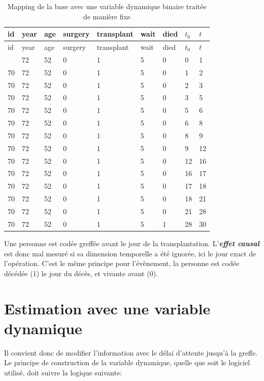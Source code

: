 \documentclass[
  12pt,
  letterpaper,
  DIV=11,
  numbers=noendperiod,
  onepage,
  openany]{scrreprt}
\begin{document}
\begin{longtable}[]{@{}lllllllll@{}}
\caption{Mapping de la base avec une variable dynamique binaire traitée
de manière fixe}\tabularnewline
\toprule\noalign{}
id & year & age & surgery & transplant & wait & died & \(t_0\) &
\(t\) \\
\midrule\noalign{}
\endfirsthead
\toprule\noalign{}
id & year & age & surgery & transplant & wait & died & \(t_0\) &
\(t\) \\
\midrule\noalign{}
\endhead
\bottomrule\noalign{}
\endlastfoot
70 & 72 & 52 & 0 & 1 & 5 & 0 & 0 & 1 \\
70 & 72 & 52 & 0 & 1 & 5 & 0 & 1 & 2 \\
70 & 72 & 52 & 0 & 1 & 5 & 0 & 2 & 3 \\
70 & 72 & 52 & 0 & 1 & 5 & 0 & 3 & 5 \\
70 & 72 & 52 & 0 & 1 & 5 & 0 & 5 & 6 \\
70 & 72 & 52 & 0 & 1 & 5 & 0 & 6 & 8 \\
70 & 72 & 52 & 0 & 1 & 5 & 0 & 8 & 9 \\
70 & 72 & 52 & 0 & 1 & 5 & 0 & 9 & 12 \\
70 & 72 & 52 & 0 & 1 & 5 & 0 & 12 & 16 \\
70 & 72 & 52 & 0 & 1 & 5 & 0 & 16 & 17 \\
70 & 72 & 52 & 0 & 1 & 5 & 0 & 17 & 18 \\
70 & 72 & 52 & 0 & 1 & 5 & 0 & 18 & 21 \\
70 & 72 & 52 & 0 & 1 & 5 & 0 & 21 & 28 \\
70 & 72 & 52 & 0 & 1 & 5 & 1 & 28 & 30 \\
\end{longtable}

Une personne est codée greffée avant le jour de la transplantation.
L'\textbf{\emph{effet causal}} est donc mal mesuré si sa dimension
temporelle a été ignorée, ici le jour exact de l'opération. C'est le
même principe pour l'évènement, la personne est codée décédée (1) le
jour du décès, et vivante avant (0).

\hypertarget{estimation-avec-une-variable-dynamique}{%
\section{Estimation avec une variable
dynamique}\label{estimation-avec-une-variable-dynamique}}

Il convient donc de modifier l'information avec le délai d'attente
jusqu'à la greffe. Le principe de construction de la variable dynamique,
quelle que soit le logiciel utilisé, doit suivre la logique suivante:
\end{document}
